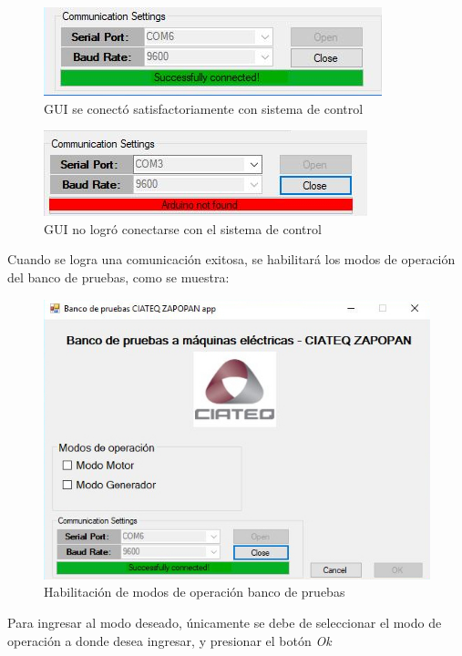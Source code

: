 \documentclass[12pt,titlepage]{article}
\begin{document}
\begin{figure}[htbp]
\hspace*{4.5cm} 
\includegraphics[scale=0.88]{exito}
\caption{GUI se conectó satisfactoriamente con sistema de control}
\end{figure}

\begin{figure}[htbp]
\hspace*{4.5cm} 
\includegraphics[scale=0.88]{fail}
\caption{GUI no logró conectarse con el sistema de control}
\end{figure}

Cuando se logra una comunicación exitosa, se habilitará los modos de operación del banco de pruebas, como se muestra: \\

\begin{figure}[htbp]
\hspace*{3.8cm} 
\includegraphics[scale=0.72]{Connected}
\caption{Habilitación de modos de operación banco de pruebas}
\end{figure}
\newpage
Para ingresar al modo deseado, únicamente se debe de seleccionar el modo de operación a donde desea ingresar, y presionar el botón \textit{Ok} 
\end{document}
